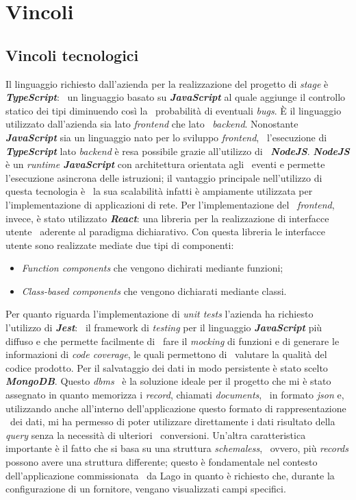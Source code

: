 \section{Vincoli}

\subsection{Vincoli tecnologici}
Il linguaggio richiesto dall'azienda per la realizzazione del progetto di \emph{stage} è \emph{\textbf{TypeScript}}: \
un linguaggio basato su \emph{\textbf{JavaScript}} al quale aggiunge il controllo statico dei tipi diminuendo così la \
probabilità di eventuali \emph{bugs}. È il linguaggio utilizzato dall'azienda sia lato \emph{\gls{frontend}} che lato \
\emph{\gls{backend}}. Nonostante \emph{\textbf{JavaScript}} sia un linguaggio nato per lo sviluppo \emph{frontend}, \
l'esecuzione di \emph{\textbf{TypeScript}} lato \emph{backend} è resa possibile grazie all'utilizzo di \
\emph{\textbf{NodeJS}}. \emph{\textbf{NodeJS}} è un \emph{runtime \textbf{JavaScript}} con architettura orientata agli \
eventi e permette l'esecuzione asincrona delle istruzioni; il vantaggio principale nell'utilizzo di questa tecnologia è \
la sua scalabilità infatti è ampiamente utilizzata per l'implementazione di applicazioni di rete. Per l'implementazione del \
\emph{frontend}, invece, è stato utilizzato \emph{\textbf{React}}: una libreria per la realizzazione di interfacce utente \
aderente al paradigma dichiarativo. Con questa libreria le interfacce utente sono realizzate mediate due tipi di componenti: \
\begin{itemize}
  \item \emph{Function components} che vengono dichirati mediante funzioni;
  \item \emph{Class-based components} che vengono dichiarati mediante classi.
\end{itemize}
Per quanto riguarda l'implementazione di \emph{unit tests} l'azienda ha richiesto l'utilizzo di \emph{\textbf{Jest}}: \
il framework di \emph{testing} per il linguaggio \emph{\textbf{JavaScript}} più diffuso e che permette facilmente di \
fare il \emph{mocking} di funzioni e di generare le informazioni di \emph{code coverage}, le quali permettono di \
valutare la qualità del codice prodotto.
Per il salvataggio dei dati in modo persistente è stato scelto \emph{\textbf{MongoDB}}. Questo \emph{\acrshort{dbms}} \
è la soluzione ideale per il progetto che mi è stato assegnato in quanto memorizza i \emph{record}, chiamati \emph{documents}, \
in formato \emph{\acrshort{json}} e, utilizzando anche all'interno dell'applicazione questo formato di rappresentazione \
dei dati, mi ha permesso di poter utilizzare direttamente i dati risultato della \emph{query} senza la necessità di ulteriori \
conversioni. Un'altra caratteristica importante è il fatto che si basa su una struttura \emph{schemaless}, \
ovvero, più \emph{records} possono avere una struttura differente; questo è fondamentale nel contesto dell'applicazione commissionata \
da Lago in quanto è richiesto che, durante la configurazione di un fornitore, vengano visualizzati campi specifici.

